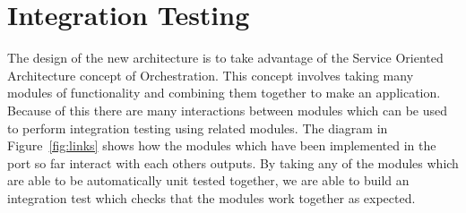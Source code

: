 \documentclass[english,12pt]{scrartcl}
\begin{document}
\section{Integration Testing}
	The design of the new architecture is to take advantage of the Service Oriented Architecture concept of Orchestration.
	This concept involves taking many modules of functionality and combining them together to make an application.
	Because of this there are many interactions between modules which can be used to perform integration testing using related modules.
	The diagram in Figure~\ref{fig:links} shows how the modules which have been implemented in the port so far interact with each others outputs.
	By taking any of the modules which are able to be automatically unit tested together, we are able to build an integration test which checks that the modules work together as expected.
	
\end{document}
